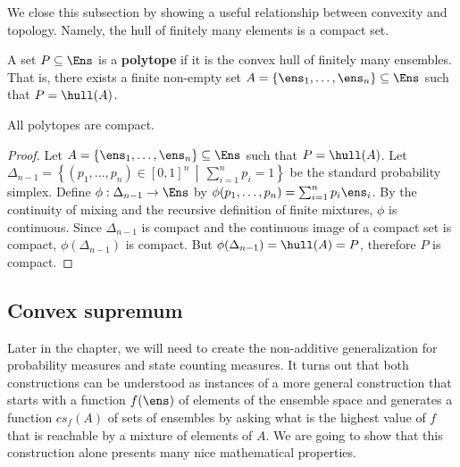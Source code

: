 We close this subsection by showing a useful relationship between convexity and topology. Namely, the hull of finitely many elements is a compact set.

\begin{mathSection}
\begin{defn}[Polytope]
	A set $P \subseteq \Ens$ is a \textbf{polytope} if it is the convex hull of finitely many ensembles. That is, there exists a finite non-empty set $A=\{\ens_1,\dots,\ens_n\}\subseteq\Ens$ such that $P = \hull(A)$.
\end{defn}

\begin{prop}
	All polytopes are compact.
\end{prop}

\begin{proof}
	Let $A=\{\ens_1,\dots,\ens_n\}\subseteq\Ens$ such that $P = \hull(A)$. Let $\Delta_{n-1}=\left\{(p_1,\dots,p_n)\in[0,1]^n \,\middle|\, \sum_{i=1}^n p_i=1\right\}$ be the standard probability simplex. Define $\phi:\Delta_{n-1}\to\Ens$ by $\phi(p_1,\dots,p_n)=\sum_{i=1}^n p_i\ens_i$. By the continuity of mixing and the recursive definition of finite mixtures, $\phi$ is continuous. Since $\Delta_{n-1}$ is compact and the continuous image of a compact set is compact, $\phi(\Delta_{n-1})$ is compact. But $\phi(\Delta_{n-1})=\hull(A)=P$, therefore $P$ is compact.
\end{proof}
\end{mathSection}

\subsection{Convex supremum}

Later in the chapter, we will need to create the non-additive generalization for probability measures and state counting measures. It turns out that both constructions can be understood as instances of a more general construction that starts with a function $f(\ens)$ of elements of the ensemble space and generates a function $cs_f(A)$ of sets of ensembles by asking what is the highest value of $f$ that is reachable by a mixture of elements of $A$. We are going to show that this construction alone presents many nice mathematical properties.

